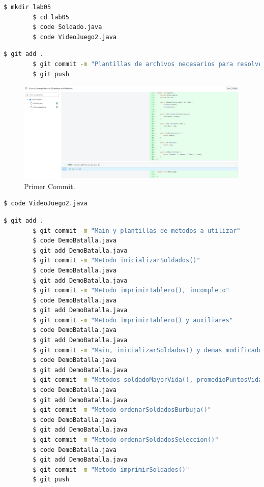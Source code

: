 \documentclass{article}
\begin{document}
\begin{lstlisting}[language=bash,caption={Creando plantillas}]
		$ mkdir lab05
		$ cd lab05
		$ code Soldado.java
		$ code VideoJuego2.java
	\end{lstlisting}
\begin{lstlisting}[language=bash,caption={Primer Commit / Plantillas}]
		$ git add .
		$ git commit -m "Plantillas de archivos necesarios para resolver las actividades del laboratorio"
		$ git push
	\end{lstlisting}
\begin{figure}[H]
	\centering
	\includegraphics[width=1\textwidth,keepaspectratio]{img/commit01.jpg}
	\caption{Primer Commit.}
\end{figure}
\begin{lstlisting}[language=bash,caption={Actualizando VideoJuego2.java}]
		$ code VideoJuego2.java
	\end{lstlisting}
\begin{lstlisting}[language=bash,caption={Segundo - Decimo Commit / DemoBatalla.java}]
		$ git add .
		$ git commit -m "Main y plantillas de metodos a utilizar"
		$ code DemoBatalla.java
		$ git add DemoBatalla.java
		$ git commit -m "Metodo inicializarSoldados()"
		$ code DemoBatalla.java
		$ git add DemoBatalla.java
		$ git commit -m "Metodo imprimirTablero(), incompleto"
		$ code DemoBatalla.java
		$ git add DemoBatalla.java
		$ git commit -m "Metodo imprimirTablero() y auxiliares"
		$ code DemoBatalla.java
		$ git add DemoBatalla.java
		$ git commit -m "Main, inicializarSoldados() y demas modificados"
		$ code DemoBatalla.java
		$ git add DemoBatalla.java
		$ git commit -m "Metodos soldadoMayorVida(), promedioPuntosVida(), sumaPuntosVida()"
		$ code DemoBatalla.java
		$ git add DemoBatalla.java
		$ git commit -m "Metodo ordenarSoldadosBurbuja()"
		$ code DemoBatalla.java
		$ git add DemoBatalla.java
		$ git commit -m "Metodo ordenarSoldadosSeleccion()"
		$ code DemoBatalla.java
		$ git add DemoBatalla.java
		$ git commit -m "Metodo imprimirSoldados()"
		$ git push
	\end{lstlisting}
\end{document}
